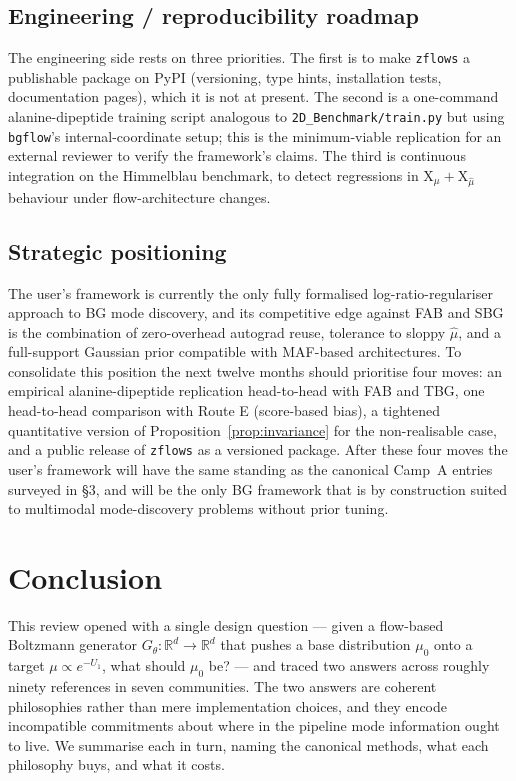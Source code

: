 \documentclass[11pt,letterpaper]{article}
\newcommand{\Real}{\mathbb{R}}
\newcommand{\Xfun}{\mathrm{X}}
\theoremstyle{plain}
\begin{document}
\subsection{Engineering / reproducibility roadmap}

The engineering side rests on three priorities. The first is to make
\texttt{zflows} a publishable package on PyPI (versioning, type hints,
installation tests, documentation pages), which it is not at present.
The second is a one-command alanine-dipeptide training script analogous to
\texttt{2D\_Benchmark/train.py} but using \texttt{bgflow}'s
internal-coordinate setup; this is the minimum-viable replication for an
external reviewer to verify the framework's claims. The third is continuous
integration on the Himmelblau benchmark, to detect regressions in
$\Xfun_\mu+\Xfun_{\hat\mu}$ behaviour under flow-architecture changes.

\subsection{Strategic positioning}

The user's framework is currently the only fully formalised
log-ratio-regulariser approach to BG mode discovery, and its competitive
edge against FAB and SBG is the combination of zero-overhead autograd reuse,
tolerance to sloppy $\hat\mu$, and a full-support Gaussian prior compatible
with MAF-based architectures. To consolidate this position the next twelve
months should prioritise four moves: an empirical alanine-dipeptide
replication head-to-head with FAB and TBG, one head-to-head comparison with
Route E (score-based bias), a tightened quantitative version of
Proposition~\ref{prop:invariance} for the non-realisable case, and a public
release of \texttt{zflows} as a versioned package. After these four moves
the user's framework will have the same standing as the canonical Camp~A
entries surveyed in \S3, and will be the only BG framework that is by
construction suited to multimodal mode-discovery problems without prior
tuning.

\section{Conclusion}\label{sec:conclusion}

This review opened with a single design question --- given a flow-based
Boltzmann generator $G_\theta:\Real^d\to\Real^d$ that pushes a base
distribution $\mu_0$ onto a target $\mu\propto e^{-U_1}$, what should $\mu_0$
be? --- and traced two answers across roughly ninety references in seven
communities. The two answers are coherent philosophies rather than mere
implementation choices, and they encode incompatible commitments about where
in the pipeline mode information ought to live. We summarise each in turn,
naming the canonical methods, what each philosophy buys, and what it costs.
\end{document}
